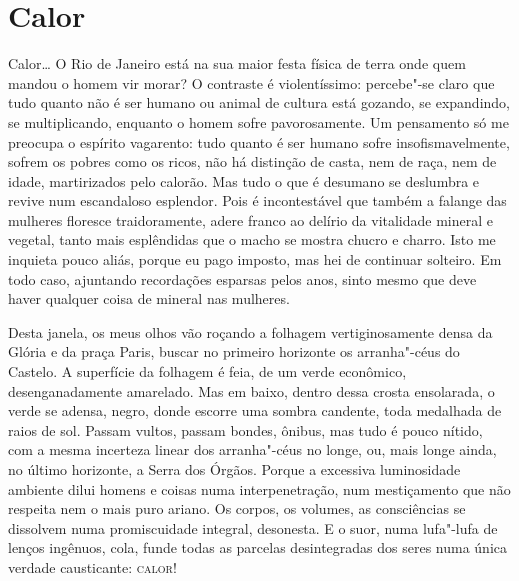 \chapter{Calor}

Calor\ldots{} O Rio de Janeiro está na sua maior festa física de terra onde
quem mandou o homem vir morar? O contraste é violentíssimo: percebe"-se
claro que tudo quanto não é ser humano ou animal de cultura está
gozando, se expandindo, se multiplicando, enquanto o homem sofre
pavorosamente. Um pensamento só me preocupa o espírito vagarento: tudo
quanto é ser humano sofre insofismavelmente, sofrem os pobres como os
ricos, não há distinção de casta, nem de raça, nem de idade,
martirizados pelo calorão. Mas tudo o que é desumano se deslumbra e
revive num escandaloso esplendor. Pois é incontestável que também a
falange das mulheres floresce traidoramente, adere franco ao delírio da
vitalidade mineral e vegetal, tanto mais esplêndidas que o macho se
mostra chucro e charro. Isto me inquieta pouco aliás, porque eu pago
imposto, mas hei de continuar solteiro. Em todo caso, ajuntando
recordações esparsas pelos anos, sinto mesmo que deve haver qualquer
coisa de mineral nas mulheres.

Desta janela, os meus olhos vão roçando a folhagem vertiginosamente
densa da Glória e da praça Paris, buscar no primeiro horizonte os
arranha"-céus do Castelo. A superfície da folhagem é feia, de um verde
econômico, desenganadamente amarelado. Mas em baixo, dentro dessa crosta
ensolarada, o verde se adensa, negro, donde escorre uma sombra candente,
toda medalhada de raios de sol. Passam vultos, passam bondes, ônibus,
mas tudo é pouco nítido, com a mesma incerteza linear dos arranha"-céus
no longe, ou, mais longe ainda, no último horizonte, a Serra dos Órgãos.
Porque a excessiva luminosidade ambiente dilui homens e coisas numa
interpenetração, num mestiçamento que não respeita nem o mais puro
ariano. Os corpos, os volumes, as consciências se dissolvem numa
promiscuidade integral, desonesta. E o suor, numa lufa"-lufa de lenços
ingênuos, cola, funde todas as parcelas desintegradas dos seres numa
única verdade causticante: \textsc{calor}!

